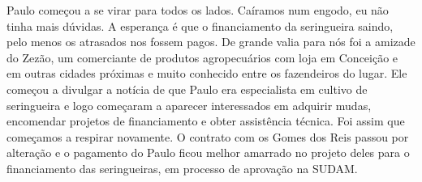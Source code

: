 Paulo começou a se virar para todos os lados.
Caíramos num engodo, eu não tinha mais dúvidas.
A esperança é que o financiamento da seringueira saindo, pelo menos os atrasados nos fossem pagos.
De grande valia para nós foi a amizade do Zezão, um comerciante de produtos agropecuários com loja em Conceição e em outras cidades próximas e muito conhecido entre os fazendeiros do lugar.
Ele começou a divulgar a notícia de que Paulo era especialista em cultivo de seringueira e logo começaram a aparecer interessados em adquirir mudas, encomendar projetos de financiamento e obter assistência técnica.
Foi assim que começamos a respirar novamente.
O contrato com os Gomes dos Reis passou por alteração e o pagamento do Paulo ficou melhor amarrado no projeto deles para o financiamento das seringueiras, em processo de aprovação na SUDAM.